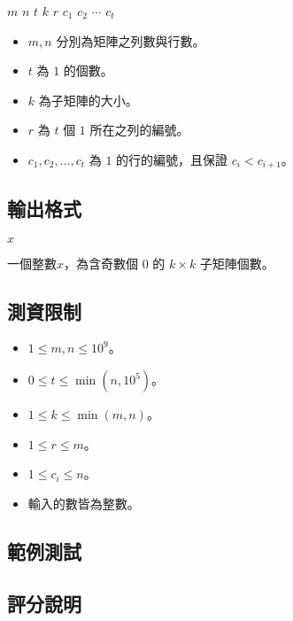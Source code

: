 \begin{format}
\f{
$m$ $n$
$t$ $k$ $r$
$c_1$ $c_2$ $\cdots$ $c_t$
}
\end{format}

\begin{itemize}
\tightlist
\item
  \(m, n\) 分別為矩陣之列數與行數。
\item
  \(t\) 為 \(1\) 的個數。
\item
  \(k\) 為子矩陣的大小。
\item
  \(r\) 為 \(t\) 個 \(1\) 所在之列的編號。
\item
  \(c_1, c_2, \ldots, c_t\) 為 \(1\) 的行的編號，且保證
  \(c_i < c_{i+1}\)。
\end{itemize}

\subsection{輸出格式}

\begin{format}
\f{
$x$
}
\end{format}

一個整數\(x\)，為含奇數個 \(0\) 的 \(k\times k\) 子矩陣個數。

\subsection{測資限制}

\begin{itemize}
\tightlist
\item
  \(1 \le m, n\le 10^9\)。
\item
  \(0 \le t \le \min(n, 10^5)\)。
\item
  \(1 \le k \le \min(m, n)\)。
\item
  \(1 \le r \le m\)。
\item
  \(1 \le c_i \le n\)。
\item
  輸入的數皆為整數。
\end{itemize}

\subsection{範例測試}

\begin{example}
%
%
\end{example}

\subsection{評分說明}

